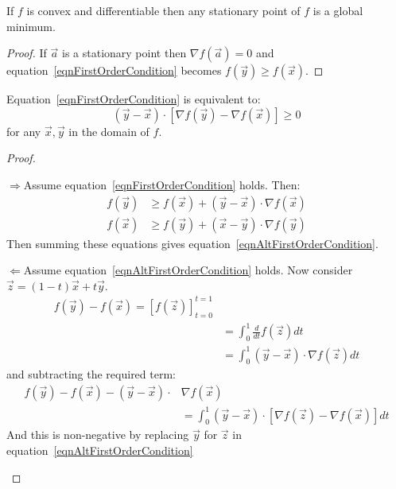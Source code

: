 \documentclass[../Main.tex]{subfiles}
\begin{document}
\begin{corollary}
    If $f$ is convex and differentiable then any stationary point of $f$ is a global minimum.
    \label{corConvexMinimum}
\end{corollary}
\begin{proof}
    If $\vec{a}$ is a stationary point then $\nabla f(\vec{a}) = 0$ and equation~\ref{eqnFirstOrderCondition} becomes $f(\vec{y}) \geq f(\vec{x})$.
\end{proof}
\begin{proposition}
    Equation~\ref{eqnFirstOrderCondition} is equivalent to:
    \begin{equation}
        (\vec{y} - \vec{x}) \cdot \left[\nabla f(\vec{y}) - \nabla f(\vec{x})\right] \geq 0
        \label{eqnAltFirstOrderCondition}
    \end{equation}
    for any $\vec{x}, \vec{y}$ in the domain of $f$.
    \label{propAltFirstOrderCondition}
\end{proposition}
\begin{proof}
    \begin{proofdirection}{$\Rightarrow$}{Assume equation~\ref{eqnFirstOrderCondition} holds.}
        Then:
        \begin{align*}
            f(\vec{y}) &\geq f(\vec{x}) + (\vec{y} - \vec{x}) \cdot \nabla f(\vec{x}) \\
            f(\vec{x}) &\geq f(\vec{y}) + (\vec{x} - \vec{y}) \cdot \nabla f(\vec{y})
        \end{align*}
        Then summing these equations gives equation~\ref{eqnAltFirstOrderCondition}.
    \end{proofdirection}
    \begin{proofdirection}{$\Leftarrow$}{Assume equation~\ref{eqnAltFirstOrderCondition} holds.}
        Now consider $\vec{z} = (1 - t) \vec{x} + t \vec{y}$.
        \begin{align*}
            f(\vec{y}) - f(\vec{x}) = \left[f(\vec{z})\right]_{t=0}^{t=1} \\
            &= \int_0^1 \frac{d}{dt} f(\vec{z}) dt \\
            &= \int_0^1 (\vec{y} - \vec{x}) \cdot \nabla f(\vec{z}) dt
        \end{align*}
        and subtracting the required term:
        \begin{align*}
            f(\vec{y}) - f(\vec{x}) - (\vec{y} - \vec{x}) \cdot &\nabla f(\vec{x}) \\
            &= \int_0^1 \left(\vec{y} - \vec{x}\right) \cdot \left[\nabla f(\vec{z}) - \nabla f(\vec{x})\right]dt
        \end{align*}
        And this is non-negative by replacing $\vec{y}$ for $\vec{z}$ in equation~\ref{eqnAltFirstOrderCondition}
    \end{proofdirection}
\end{proof}
\end{document}
